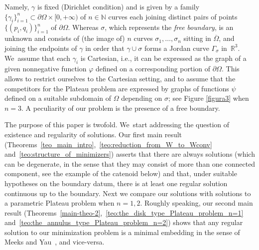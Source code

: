 \documentclass[11pt]{article}
\newcommand{\ie}{i.e.,\xspace}
\numberwithin{equation}{section}
\newcommand{\R}{\mathbb{R}}
\let\Om\Omega
\theoremstyle{definition}
\begin{document}
Namely, $\gamma$ is fixed (Dirichlet condition) and
is given by a family
$\{\gamma_i\}_{i=1}^n\subset\partial \Om\times [0,+\infty)$
of $n\in\mathbb{N}$
curves
each joining distinct pairs of points $\{(p_i,q_i)\}_{i=1}^n$
of $\partial \Om$.
Whereas $\sigma$, which represents
the {\it free boundary}, is an unknown and
consists of (the image of)
$n$ curves $\sigma_1,\dots,\sigma_n$
sitting in $\overline\Omega$, and
joining the endpoints of $\gamma$
in order that $\gamma\cup\sigma$ forms a Jordan curve $\Gamma_\sigma$
in~$\R^3$. We~assume that each $\gamma_i$
is Cartesian, \ie it can be expressed as the graph of a given nonnegative function $\varphi$
defined on a corresponding portion of
$\partial \Omega$. This allows to restrict ourselves
to the Cartesian setting, and to assume that the competitors
for the Plateau problem are expressed by graphs of functions $\psi$
defined on a suitable subdomain of $\Omega$ depending on $\sigma$;
see Figure \ref{figura3} when $n=3$.
A peculiarity of our problem is the presence of a free boundary.

The purpose of this paper is twofold. We~start
addressing the question of existence and regularity of solutions.
Our first main result
(Theorems~\ref{teo_main_intro},~\ref{teo:reduction_from_W_to_Wconv} and~\ref{teo:structure_of_minimizers}) asserts that there are always solutions (which can be degenerate, in the sense that they may consist of more than one connected component,
see the example of the catenoid below) and that, under suitable hypotheses on the boundary datum, there is at least one regular solution continuous up to the boundary. Next we compare our solutions with solutions to a parametric Plateau problem when $n=1,2$.
Roughly speaking, our second main result (Theorems~\ref{main-theo-2},~\ref{teo:the_disk_type_Plateau_problem_n=1} and~\ref{teo:the_annulus_type_Plateau_problem_n=2}) shows that any regular solution to our minimization problem is a minimal embedding in the sense of Meeks and Yau~\cite{MY}, and vice-versa.
\end{document}
